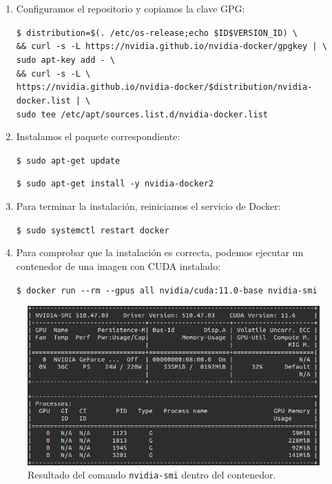\begin{enumerate}
\item Configuramos el repositorio y copiamos la clave GPG:

\texttt{\$ distribution=\$(. /etc/os-release;echo \$ID\$VERSION{\_}ID) \textbackslash \\ \&\& curl -s -L https://nvidia.github.io/nvidia-docker/gpgkey | \textbackslash \\ sudo apt-key add - \textbackslash \\ \&\& curl -s -L \textbackslash \\ https://nvidia.github.io/nvidia-docker/\$distribution/nvidia-docker.list | \textbackslash \\ sudo tee /etc/apt/sources.list.d/nvidia-docker.list}

\item Instalamos el paquete correspondiente:

\texttt{\$ sudo apt-get update}

\texttt{\$ sudo apt-get install -y nvidia-docker2}

\item Para terminar la instalación, reiniciamos el servicio de Docker:

\texttt{\$ sudo systemctl restart docker}

\item Para comprobar que la instalación es correcta, podemos ejecutar un contenedor de una imagen con CUDA instalado:

\texttt{\$ docker run {-}{-}rm {-}{-}gpus all nvidia/cuda:11.0-base nvidia-smi}

\end{enumerate}

\begin{figure}[H]
\centering
\includegraphics[width=1\linewidth]{imagenes/nvidia-smi.png} 
\captionsetup{width=1\linewidth}
\caption{Resultado del comando \texttt{nvidia-smi} dentro del contenedor.}
\label{fig:performer}
\end{figure}

